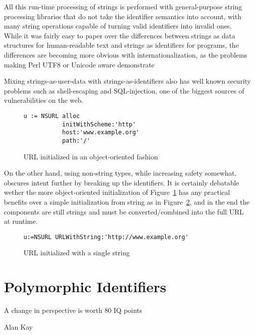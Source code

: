 \documentclass[preprint,authoryear]{acm_proc_article-sp}
\begin{document}
All this run-time processing of strings is performed with general-purpose string
processing libraries that do not take the identifier semantics into account, with
many string operations capable of turning valid identifiers into invalid ones.
While it was fairly easy to paper over the differences between strings as 
data structures for human-readable text and strings as identifiers for programs,
the differences are becoming more obvious with internationalization, as the
problems making Perl UTF8 or Unicode aware demonstrate \cite{perl-unicode}

Mixing strings-as-user-data with strings-as-identifiers also has well known
security problems such as shell-escaping and SQL-injection, one of the
biggest sources of vulnerabilities on the web.



\begin{figure}[htbp]
\begin{center}
\begin{verbatim}
u := NSURL alloc
           initWithScheme:'http'
           host:'www.example.org'
           path:'/' 
\end{verbatim}
\caption{URL initialized in an object-oriented fashion}
\label{url-as-obj}
\end{center}
\end{figure}

On the other hand, using non-string types, while increasing safety somewhat,
obscures intent further by breaking up the identifiers.
It is certainly debatable wether the more object-oriented
initialization of Figure~\ref{url-as-obj}  has any practical benefits over a
simple initialization from string as in Figure~\ref{url-as-string}, and in
the end the components are still strings and must be converted/combined
into the full URL at runtime.


\begin{figure}[htbp]
\begin{center}
\begin{verbatim}
u:=NSURL URLWithString:'http://www.example.org'
\end{verbatim}
\caption{URL initialized with a single string}
\label{url-as-string}
\end{center}
\end{figure}





\section{Polymorphic Identifiers}
\epigraph{A change in perspective is worth 80 IQ points}{Alan Kay}
\end{document}
